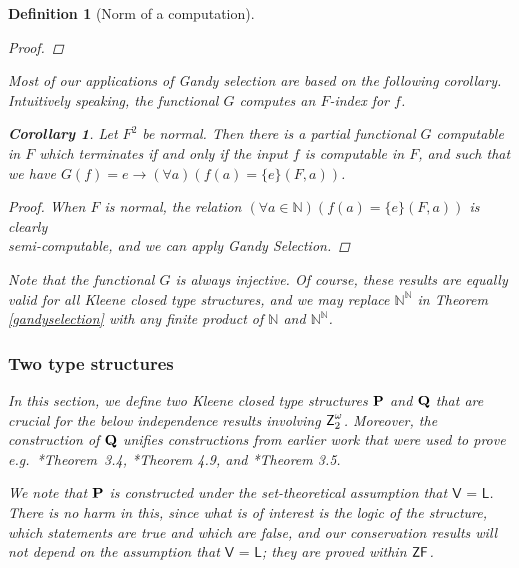 \documentclass[reqno]{amsart}
\newtheorem{defi}[thm]{Definition}
\newtheorem{corollary}[thm]{Corollary}
\def\Z{\textup{\textsf{Z}}}
\def\ZF{\textup{\textsf{ZF}}}
\def\N{{\mathbb  N}}
\def\di{\rightarrow}
\numberwithin{equation}{section}
\numberwithin{thm}{section}
\begin{document}
\begin{defi}[Norm of a computation]
\begin{proof}
\end{proof}
Most of our applications of Gandy selection are based on the following corollary. 
Intuitively speaking, the functional $G$ computes an $F$-index for $f$.
\begin{corollary}\label{cor.inj} 
Let $F^{2}$ be normal. Then there is a partial functional $G$ computable in $F$ which terminates if and only if the input $f$ is computable in $F$, and such that we have $G(f) = e\di (\forall a)(f(a) = \{e\}(F,a))$.  %
\end{corollary}
\begin{proof} When $F$ is normal, the relation $(\forall a \in \N)(f(a) = \{e\}(F,a))$ is clearly\\ semi-computable, and we can apply Gandy Selection.\end{proof}
Note that the functional $G$ is always injective.
Of course, these results are equally valid for all Kleene closed type structures, and we may replace $\N^\N$ in Theorem \ref{gandyselection} with any finite product of $\N$ and $\N^\N$.


\subsubsection{Two type structures}\label{models}
In this section, we define two Kleene closed type structures ${\bf P}$ and $\bf Q$ that are crucial for the below independence results involving $\Z_{2}^{\omega}$.
Moreover, the construction of ${\bf Q}$ unifies constructions from earlier work that were used to prove e.g.\ \cite{dagsam}*{Theorem~3.4}, \cite{dagsamV}*{Theorem 4.9}, and \cite{dagsamVII}*{Theorem 3.5}.

\smallskip

We note that ${\bf P}$ is constructed under the set-theoretical assumption that $\textsf{V = L}$. 
There is no harm in this, since what is of interest is the logic of the structure, which statements are true and which are false, and our conservation results will not depend on the assumption that $\textsf{V = L}$; they are proved within $\ZF$.

\smallskip


\end{defi}
\end{document}
